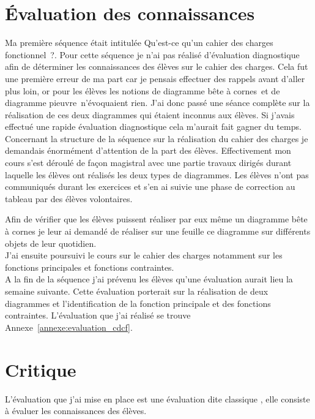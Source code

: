 
\section{Évaluation des connaissances}

Ma première séquence était intitulée \og Qu'est-ce qu'un cahier des charges fonctionnel~?\fg. 
Pour cette séquence je n'ai pas réalisé d'évaluation diagnostique afin de déterminer les connaissances des élèves sur le cahier des charges.
Cela fut une première erreur de ma part car je pensais effectuer des rappels avant d'aller plus loin, or pour les élèves les notions de \og diagramme bête à cornes\fg ~et de \og diagramme pieuvre\fg ~n'évoquaient rien.
J'ai donc passé une séance complète sur la réalisation de ces deux diagrammes qui étaient inconnus aux élèves.
Si j'avais effectué une rapide évaluation diagnostique cela m'aurait fait gagner du temps.\\

Concernant la structure de la séquence sur la réalisation du cahier des charges je demandais énormément d'attention de la part des élèves. 
Effectivement mon cours s'est déroulé de façon magistral avec une partie travaux dirigés durant laquelle les élèves ont réalisés les deux types de diagrammes.
Les élèves n'ont pas communiqués durant les exercices et s'en ai suivie une phase de correction au tableau par des élèves volontaires.

Afin de vérifier que les élèves puissent réaliser par eux même un diagramme bête à cornes je leur ai demandé de réaliser sur une feuille ce diagramme sur différents objets de leur quotidien.\\

J'ai ensuite poursuivi le cours sur le cahier des charges notamment sur les fonctions principales et fonctions contraintes.\\

A la fin de la séquence j'ai prévenu les élèves qu'une évaluation aurait lieu la semaine suivante.
Cette évaluation porterait sur la réalisation de deux diagrammes et l'identification de la fonction principale et des fonctions contraintes.
L'évaluation que j'ai réalisé se trouve Annexe~\ref{annexe:evaluation_cdcf}.

\newpage
\section{Critique}

L'évaluation que j'ai mise en place est une évaluation dite \og classique \fg, elle consiste à évaluer les connaissances des élèves.

